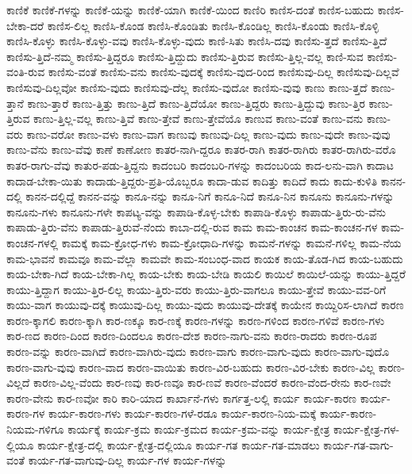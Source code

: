 {ಕಾಣಿಕೆ
ಕಾಣಿಕೆ-ಗಳನ್ನು
ಕಾಣಿಕೆ-ಯನ್ನು
ಕಾಣಿಕೆ-ಯಾಗಿ
ಕಾಣಿಕೆ-ಯಿಂದ
ಕಾಣಿರಿ
ಕಾಣಿಸ-ದಂತೆ
ಕಾಣಿಸ-ಬಹುದು
ಕಾಣಿಸ-ಬೇಕಾ-ದರೆ
ಕಾಣಿಸ-ಲಿಲ್ಲ
ಕಾಣಿಸಿ-ಕೊಂಡ
ಕಾಣಿಸಿ-ಕೊಂಡಿತು
ಕಾಣಿಸಿ-ಕೊಂಡಿಲ್ಲ
ಕಾಣಿಸಿ-ಕೊಂಡು
ಕಾಣಿಸಿ-ಕೊಳ್ಳಿ
ಕಾಣಿಸಿ-ಕೊಳ್ಳು
ಕಾಣಿಸಿ-ಕೊಳ್ಳು-ವವು
ಕಾಣಿಸಿ-ಕೊಳ್ಳು-ವುದು
ಕಾಣಿ-ಸಿತು
ಕಾಣಿಸಿ-ದವು
ಕಾಣಿಸು-ತ್ತದೆ
ಕಾಣಿಸು-ತ್ತಿದೆ
ಕಾಣಿಸು-ತ್ತಿದೆ-ನಮ್ಮ
ಕಾಣಿಸು-ತ್ತಿದ್ದರೂ
ಕಾಣಿಸು-ತ್ತಿದ್ದುದು
ಕಾಣಿಸು-ತ್ತಿರುವ
ಕಾಣಿಸು-ತ್ತಿಲ್ಲ-ವಲ್ಲ
ಕಾಣಿ-ಸುವ
ಕಾಣಿಸು-ವಂತಿ-ರುವ
ಕಾಣಿಸು-ವಂತೆ
ಕಾಣಿಸು-ವನು
ಕಾಣಿಸು-ವುದಕ್ಕೆ
ಕಾಣಿಸು-ವುದ-ರಿಂದ
ಕಾಣಿಸುವು-ದಿಲ್ಲ
ಕಾಣಿಸುವು-ದಿಲ್ಲವೆ
ಕಾಣಿಸುವು-ದಿಲ್ಲವೋ
ಕಾಣಿಸು-ವುದು
ಕಾಣಿಸುವು-ದೆಲ್ಲ
ಕಾಣಿಸು-ವುದೋ
ಕಾಣಿಸು-ವುವು
ಕಾಣು
ಕಾಣು-ತ್ತದೆ
ಕಾಣು-ತ್ತಾನೆ
ಕಾಣು-ತ್ತಾರೆ
ಕಾಣು-ತ್ತಿತ್ತು
ಕಾಣು-ತ್ತಿದೆ
ಕಾಣು-ತ್ತಿದೆಯೋ
ಕಾಣು-ತ್ತಿದ್ದರು
ಕಾಣು-ತ್ತಿದ್ದುವು
ಕಾಣು-ತ್ತಿರ
ಕಾಣು-ತ್ತಿರುವ
ಕಾಣು-ತ್ತಿಲ್ಲ-ವಲ್ಲ
ಕಾಣು-ತ್ತಿವೆ
ಕಾಣು-ತ್ತೇವೆ
ಕಾಣು-ತ್ತೇವೆಯೊ
ಕಾಣುವ
ಕಾಣು-ವಂತೆ
ಕಾಣು-ವನು
ಕಾಣು-ವರು
ಕಾಣು-ವರೋ
ಕಾಣು-ವಳು
ಕಾಣು-ವಾಗ
ಕಾಣುವು
ಕಾಣುವು-ದಿಲ್ಲ
ಕಾಣು-ವುದು
ಕಾಣು-ವುದೇ
ಕಾಣು-ವುವು
ಕಾಣು-ವೆನು
ಕಾಣು-ವೆವು
ಕಾಣೆ
ಕಾಣೋಣ
ಕಾತರ-ನಾಗಿ-ದ್ದರೂ
ಕಾತರ-ರಾಗಿ
ಕಾತರ-ರಾಗಿರು
ಕಾತರ-ರಾಗಿರು-ವರೊ
ಕಾತರ-ರಾಗು-ವೆವು
ಕಾತುರ-ಪಡು-ತ್ತಿದ್ದನು
ಕಾದಂಬರಿ
ಕಾದಂಬರಿ-ಗಳನ್ನು
ಕಾದಂಬರಿಯ
ಕಾದ-ಲನು-ವಾಗಿ
ಕಾದಾಟ
ಕಾದಾಡ-ಬೇಕಾ-ಯಿತು
ಕಾದಾಡು-ತ್ತಿದ್ದರು-ಪ್ರತಿ-ಯೊಬ್ಬರೂ
ಕಾದಾ-ಡುವ
ಕಾದಿತ್ತು
ಕಾದಿದೆ
ಕಾದು
ಕಾದು-ಕುಳಿತಿ
ಕಾನನ-ದಲ್ಲಿ
ಕಾನನ-ದಲ್ಲಿದ್ದೆ
ಕಾನನ-ವನ್ನು
ಕಾನೂ-ನನ್ನು
ಕಾನೂ-ನಿಗೆ
ಕಾನೂ-ನಿದೆ
ಕಾನೂ-ನಿನ
ಕಾನೂನು
ಕಾನೂನು-ಗಳನ್ನು
ಕಾನೂನು-ಗಳು
ಕಾನೂನು-ಗಳೇ
ಕಾಪಟ್ಯ-ವನ್ನು
ಕಾಪಾಡಿ-ಕೊಳ್ಳ-ಬೇಕು
ಕಾಪಾಡಿ-ಕೊಳ್ಳು
ಕಾಪಾಡು-ತ್ತಿರು-ರು-ವೆನು
ಕಾಪಾಡು-ತ್ತಿರು-ವೆನು
ಕಾಪಾಡು-ತ್ತಿರುವೆ-ನೆಂದು
ಕಾಬಾ-ದಲ್ಲಿ-ರುವ
ಕಾಮ
ಕಾಮ-ಕಾಂಚನ
ಕಾಮ-ಕಾಂಚನ-ಗಳ
ಕಾಮ-ಕಾಂಚನ-ಗಳಲ್ಲಿ
ಕಾಮಕ್ಕೆ
ಕಾಮ-ಕ್ರೋಧ-ಗಳು
ಕಾಮ-ಕ್ರೋಧಾದಿ-ಗಳನ್ನು
ಕಾಮನೆ-ಗಳನ್ನು
ಕಾಮನೆ-ಗಳಿಲ್ಲ
ಕಾಮ-ನೆಯ
ಕಾಮ-ಭಾವನೆ
ಕಾಮವೂ
ಕಾಮ-ವೆಲ್ಲಾ
ಕಾಮವೇ
ಕಾಮ-ಸಂಬಂಧ-ವಾದ
ಕಾಯಕ
ಕಾಯ-ತೊಡ-ಗಿದ
ಕಾಯ-ಬಹುದು
ಕಾಯ-ಬೇಕಾ-ಗಿದೆ
ಕಾಯ-ಬೇಕಾ-ಗಿಲ್ಲ
ಕಾಯ-ಬೇಕು
ಕಾಯ-ಬೇಡಿ
ಕಾಯಲಿ
ಕಾಯಿಲೆ
ಕಾಯಿಲೆ-ಯನ್ನು
ಕಾಯು-ತ್ತಿದ್ದರೆ
ಕಾಯು-ತ್ತಿದ್ದಾಗ
ಕಾಯು-ತ್ತಿರ-ಲಿಲ್ಲ
ಕಾಯು-ತ್ತಿರು-ವರು
ಕಾಯು-ತ್ತಿರು-ವಾಗಲೂ
ಕಾಯು-ತ್ತೇವೆ
ಕಾಯು-ವವ-ರಿಗೆ
ಕಾಯು-ವಾಗ
ಕಾಯುವು-ದಕ್ಕೆ
ಕಾಯುವು-ದಿಲ್ಲ
ಕಾಯು-ವುದು
ಕಾಯುವು-ದೇತಕ್ಕೆ
ಕಾಯೇನ
ಕಾಯ್ದಿರಿಸ-ಲಾಗಿದೆ
ಕಾರಣ
ಕಾರಣ-ಕ್ಕಾಗಲಿ
ಕಾರಣ-ಕ್ಕಾಗಿ
ಕಾರ-ಣಕ್ಕೂ
ಕಾರ-ಣಕ್ಕೆ
ಕಾರಣ-ಗಳನ್ನು
ಕಾರಣ-ಗಳಿಂದ
ಕಾರಣ-ಗಳಿವೆ
ಕಾರಣ-ಗಳು
ಕಾರ-ಣದ
ಕಾರಣ-ದಿಂದ
ಕಾರಣ-ದಿಂದಲೂ
ಕಾರಣ-ದೇಶ
ಕಾರಣ-ನಾಗು-ವನು
ಕಾರಣ-ರಾದರು
ಕಾರಣ-ರೂಪ
ಕಾರಣ-ವನ್ನು
ಕಾರಣ-ವಾಗಿದೆ
ಕಾರಣ-ವಾಗಿರು-ವುದು
ಕಾರಣ-ವಾಗು
ಕಾರಣ-ವಾಗು-ವುದು
ಕಾರಣ-ವಾಗು-ವುದೊ
ಕಾರಣ-ವಾಗು-ವುವು
ಕಾರಣ-ವಾದ
ಕಾರಣ-ವಾಯಿತು
ಕಾರಣ-ವಿರ-ಬಹುದು
ಕಾರಣ-ವಿರ-ಬೇಕು
ಕಾರಣ-ವಿಲ್ಲ
ಕಾರಣ-ವಿಲ್ಲದೆ
ಕಾರಣ-ವಿಲ್ಲ-ವೆಂದು
ಕಾರ-ಣವು
ಕಾರ-ಣವೂ
ಕಾರ-ಣವೆ
ಕಾರಣ-ವೆಂದರೆ
ಕಾರಣ-ವೆಂದ-ರೇನು
ಕಾರ-ಣವೇ
ಕಾರಣ-ವೇನು
ಕಾರ-ಣವೋ
ಕಾರಿ
ಕಾರಿ-ಯಾದ
ಕಾರ್ಖಾನೆ-ಗಳು
ಕಾರ್ಗತ್ತ-ಲಲ್ಲಿ
ಕಾರ್ಯ
ಕಾರ್ಯ-ಕಾರಣ
ಕಾರ್ಯ-ಕಾರಣ-ಗಳ
ಕಾರ್ಯ-ಕಾರಣ-ಗಳು
ಕಾರ್ಯ-ಕಾರಣ-ಗಳೆ-ರಡೂ
ಕಾರ್ಯ-ಕಾರಣ-ನಿಯ-ಮಕ್ಕೆ
ಕಾರ್ಯ-ಕಾರಣ-ನಿಯಮ-ಗಳಿಗೂ
ಕಾರ್ಯಕ್ಕೆ
ಕಾರ್ಯ-ಕ್ರಮ
ಕಾರ್ಯ-ಕ್ರಮದ
ಕಾರ್ಯ-ಕ್ರಮ-ವನ್ನು
ಕಾರ್ಯ-ಕ್ಷೇತ್ರ
ಕಾರ್ಯ-ಕ್ಷೇತ್ರ-ಗಳ-ಲ್ಲಿಯೂ
ಕಾರ್ಯ-ಕ್ಷೇತ್ರ-ದಲ್ಲಿ
ಕಾರ್ಯ-ಕ್ಷೇತ್ರ-ದಲ್ಲಿಯೂ
ಕಾರ್ಯ-ಗತ
ಕಾರ್ಯ-ಗತ-ಮಾಡಲು
ಕಾರ್ಯ-ಗತ-ವಾಗು-ವಂತೆ
ಕಾರ್ಯ-ಗತ-ವಾಗುವು-ದಿಲ್ಲ
ಕಾರ್ಯ-ಗಳ
ಕಾರ್ಯ-ಗಳನ್ನು
}
